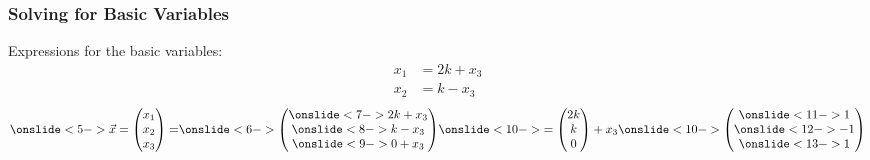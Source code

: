 \begin{frame}
\frametitle{Solving for Basic Variables}
Expressions for the basic variables:
\begin{align*}
    x_1 &= 2k + x_3 \\
    x_2 &= k - x_3 
\end{align*}
 
\begin{align*}
    \onslide<5->{\vec{x} 
        = \begin{pmatrix} x_1\\x_2\\x_3 \end{pmatrix} 
        = }
        \onslide<6->{\begin{pmatrix} \onslide<7->{2k+x_3}\\\onslide<8->{k-x_3}\\\onslide<9->{0+x_3} \end{pmatrix} }
        \onslide<10->{= \begin{pmatrix} 2k \\ k \\ 0 \end{pmatrix} + x_3 } \onslide<10->{\begin{pmatrix} \onslide<11->{1} \\ \onslide<12->{-1} \\ \onslide<13->{1} \end{pmatrix}}
\end{align*}
\end{frame}


